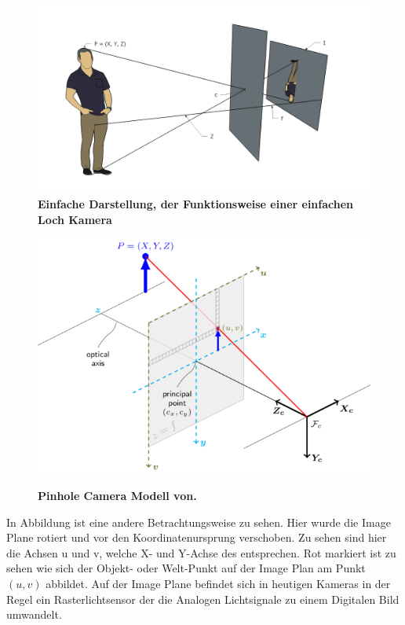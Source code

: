 \begin{figure}
\includegraphics[width=\textwidth]{media/simple-pinhole.png}\\
\caption{\textbf{Einfache Darstellung, der Funktionsweise einer einfachen Loch Kamera}
}
\label{Fig:simple-pinhole}
\includegraphics[width=\textwidth]{media/pinhole_camera_model}\\
\caption{\textbf{Pinhole Camera Modell von.\autocite{OpencvCamera2016}}
}
\label{Fig:pinhole}
\end{figure}

In Abbildung  ist eine andere Betrachtungsweise zu sehen. Hier wurde die Image Plane rotiert und vor den Koordinatenursprung verschoben. Zu sehen sind hier die Achsen u und v, welche X- und Y-Achse des entsprechen. Rot markiert ist zu sehen wie sich der Objekt- oder Welt-Punkt auf der Image Plan am Punkt $(u, v)$ abbildet. Auf der Image Plane befindet sich in heutigen Kameras in der Regel ein Rasterlichtsensor der die Analogen Lichtsignale zu einem Digitalen Bild umwandelt. 

